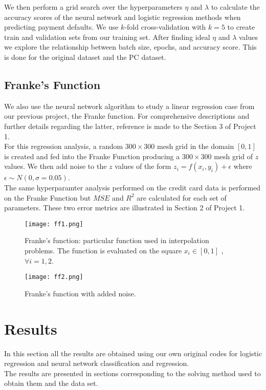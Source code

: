 \documentclass{emulateapj}
\begin{document}
We then perform a grid search over the hyperparameters $\eta$ and $\lambda$ to calculate the accuracy scores of the neural network and logistic regression methods when predicting payment defaults. We use $k$-fold cross-validation with $k=5$ to create train and validation sets from our training set. After finding ideal $\eta$ and $\lambda$ values we explore the relationship between batch size, epochs, and accuracy score. This is done for the original dataset and the PC dataset.


\subsection{Franke's Function}
We also use the neural network algorithm to study a linear regression case from our previous project, the Franke function.
For comprehensive descriptions and further details regarding the latter, reference is made to the Section 3 of Project 1.\\
For this regression analysis, a random $300\times300$ mesh grid in the domain $[0,1]$ is created and fed into the Franke Function producing a $300\times300$ mesh grid of $z$ values. We then add noise to the $z$ values of the form $z_i=f(x_i,y_i)+\epsilon$ where $\epsilon \sim N(0,\sigma=0.05)$.\\
The same hyperparamter analysis performed on the credit card data is performed on the Franke Function but $MSE$ and $R^2$ are calculated for each set of parameters.
These two error metrics are illustrated in Section 2 of Project 1.
\begin{figure}[h]
    \centering
    \texttt{[image: ff1.png]}
    \caption{Franke's function: particular function used in interpolation problems. The function is evaluated on the square $x_i \in [0, 1]$ , $\forall i=1,2$.}
    \label{fig:my_label}
\end{figure}
\begin{figure}[H]
    \centering
    \texttt{[image: ff2.png]}
    \caption{Franke's function with added noise.}
    \label{fig:my_label}
\end{figure}


\section{Results}
In this section all the results are obtained using our own original codes for logistic regression and neural network classification and regression.\\ The results are presented in sections corresponding to the solving method used to obtain them and the data set.
\end{document}
